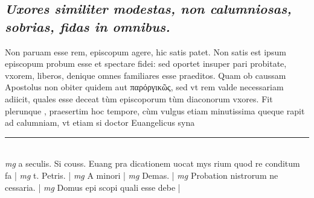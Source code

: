\documentclass{article}
\begin{document}
\begin{pages}
\subsection*{\textit{Uxores similiter modestas, non calumniosas, sobrias, fidas in omnibus. }}\pstart Non paruam esse rem, episcopum agere, hic satis patet. Non satis est ipsum episcopum probum esse et spectare fidei: sed oportet insuper pari probitate, vxorem, liberos, denique omnes familiares esse praeditos. Quam ob caussam Apostolus non obiter quidem aut παρόργικῶς, sed vt rem valde necessariam adiicit, quales esse deceat tùm episcoporum tùm diaconorum vxores. Fit plerunque , praesertim hoc tempore, cùm vulgus etiam minutissima queque rapit ad calumniam, vt etiam si doctor Euangelicus syna  \pend
\vspace{0.5cm}\noindent
\vspace{0.2cm}\rule{1cm}{0.2pt}\\ 
\hspace{0.2cm}\textit{mg}
\footnotesize a seculis. Si couss. Euang pra dicationem uocat mys rium quod re conditum fa 
\normalsize| 
\hspace{0.2cm}\textit{mg}
\footnotesize t. Petris. 
\normalsize| 
\hspace{0.2cm}\textit{mg}
\footnotesize A minori 
\normalsize| 
\hspace{0.2cm}\textit{mg}
\footnotesize Demas. 
\normalsize| 
\hspace{0.2cm}\textit{mg}
\footnotesize Probation nistrorum ne cessaria. 
\normalsize| 
\hspace{0.2cm}\textit{mg}
\footnotesize Domus epi scopi quali esse debe
\normalsize| 

\end{pages}
\end{document}
